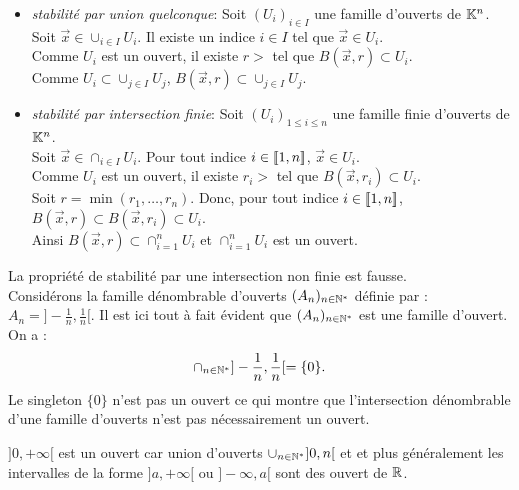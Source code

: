 \documentclass{book}
\begin{document}
\begin{Demonstration}
\begin{itemize}
\item \emph{stabilité par union quelconque}:
  Soit $(U_i)_{i\in I}$ une famille d'ouverts de $\mathbb{K}^n$.\\
  Soit $\vec{x}\in\cup_{i\in I} U_i$. Il existe un indice $i\in I$ tel que $\vec{x}\in U_i$.\\
  Comme $U_i$ est un ouvert, il existe $r>$ tel que $B(\vec{x},r)\subset U_i$.\\
  Comme  $U_i\subset \cup_{j\in I} U_j$, $B(\vec{x},r)\subset\cup_{j\in I} U_j$.
\item \emph{stabilité par intersection finie}:
  Soit $(U_i)_{1\leq i\leq n}$ une famille finie d'ouverts de $\mathbb{K}^n$.\\
 Soit $\vec{x}\in\cap_{i\in I} U_i$. Pour tout indice $i\in \mathopen\lbrack\!\lbrack1,n \mathclose\rbrack\!\rbrack$, $\vec{x}\in U_i$.\\
  Comme $U_i$ est un ouvert, il existe $r_i>$ tel que $B(\vec{x},r_i)\subset U_i$.\\
  Soit $r=\min(r_1,\dots,r_n)$. Donc, pour tout indice $i\in \mathopen\lbrack\!\lbrack1,n \mathclose\rbrack\!\rbrack$, $B(\vec{x},r)\subset B(\vec{x},r_i)\subset U_i$.\\
  Ainsi $B(\vec{x},r)\subset \cap_{i=1}^n U_i$ et $\cap_{i=1}^n U_i$ est un ouvert. 
\end{itemize}
\end{Demonstration}
\begin{Remarque} La propriété de stabilité par une intersection non finie est fausse.\\
Considérons la famille dénombrable d'ouverts $(A_n)_{n\in\mathbb{N}^*}$ définie par : $A_n =]-\frac 1 n ,\frac 1 n[$. 
Il est ici tout à fait évident que $(A_n)_{n\in\mathbb{N}^*}$ est une famille d'ouvert. On a :
$$\cap_{n\in\mathbb{N}^*}]-\frac 1 n ,\frac 1 n[=\{0\}.$$
Le singleton $\{0\}$ n'est pas un ouvert ce qui montre que l'intersection dénombrable d'une famille d'ouverts n'est
pas nécessairement un ouvert.
\end{Remarque}
\begin{Exemple}[Dans $\R$]
$]0,+\infty[$ est un ouvert car union d'ouverts $\cup_{n\in \mathbb{N}^*}]0,n[$ et et plus généralement les intervalles de la forme $]a,+\infty[$ ou $]-\infty,a[$ sont des ouvert de $\R$.
\end{Exemple}
\end{document}
